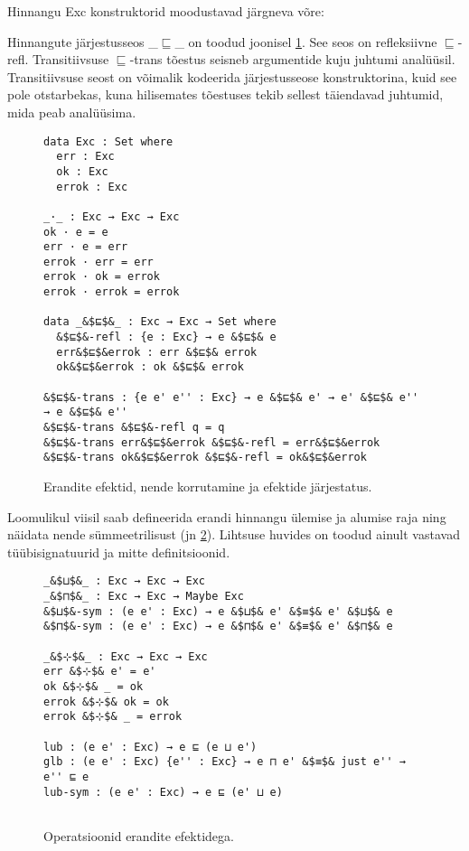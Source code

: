 \documentclass[a4paper,12pt]{article}
\begin{document}
Hinnangu Exc konstruktorid moodustavad järgneva võre:
\begin{center}
\end{center}
Hinnangute järjestusseos _$⊑$_ on toodud joonisel \ref{fig:exc.exc}. See seos on refleksiivne $⊑$-refl. Transitiivsuse $⊑$-trans tõestus seisneb argumentide kuju juhtumi analüüsil. Transitiivsuse seost on võimalik kodeerida järjestusseose konstruktorina, kuid see pole otstarbekas, kuna hilisemates tõestuses tekib sellest täiendavad juhtumid, mida peab analüüsima.
\begin{figure}
  \begin{lstlisting}
data Exc : Set where
  err : Exc
  ok : Exc
  errok : Exc
  
_·_ : Exc → Exc → Exc
ok · e = e
err · e = err
errok · err = err
errok · ok = errok
errok · errok = errok

data _&$⊑$&_ : Exc → Exc → Set where
  &$⊑$&-refl : {e : Exc} → e &$⊑$& e
  err&$⊑$&errok : err &$⊑$& errok
  ok&$⊑$&errok : ok &$⊑$& errok
  
&$⊑$&-trans : {e e' e'' : Exc} → e &$⊑$& e' → e' &$⊑$& e'' → e &$⊑$& e''
&$⊑$&-trans &$⊑$&-refl q = q
&$⊑$&-trans err&$⊑$&errok &$⊑$&-refl = err&$⊑$&errok
&$⊑$&-trans ok&$⊑$&errok &$⊑$&-refl = ok&$⊑$&errok
  \end{lstlisting}
  \caption{Erandite efektid, nende korrutamine ja efektide järjestatus.}
  \label{fig:exc.exc}
\end{figure}

Loomulikul viisil saab defineerida erandi hinnangu ülemise ja alumise raja ning näidata nende sümmeetrilisust (jn \ref{fig:exc.ops}).
Lihtsuse huvides on toodud ainult vastavad tüübisignatuurid ja mitte definitsioonid.
\begin{figure}
  \begin{lstlisting}
_&$⊔$&_ : Exc → Exc → Exc
_&$⊓$&_ : Exc → Exc → Maybe Exc
&$⊔$&-sym : (e e' : Exc) → e &$⊔$& e' &$≡$& e' &$⊔$& e
&$⊓$&-sym : (e e' : Exc) → e &$⊓$& e' &$≡$& e' &$⊓$& e

_&$⊹$&_ : Exc → Exc → Exc
err &$⊹$& e' = e'
ok &$⊹$& _ = ok
errok &$⊹$& ok = ok
errok &$⊹$& _ = errok
    
lub : (e e' : Exc) → e ⊑ (e ⊔ e')
glb : (e e' : Exc) {e'' : Exc} → e ⊓ e' &$≡$& just e'' → e'' ⊑ e
lub-sym : (e e' : Exc) → e ⊑ (e' ⊔ e)
    
  \end{lstlisting}
  \caption{Operatsioonid erandite efektidega.}
  \label{fig:exc.ops}
\end{figure}
\end{document}
